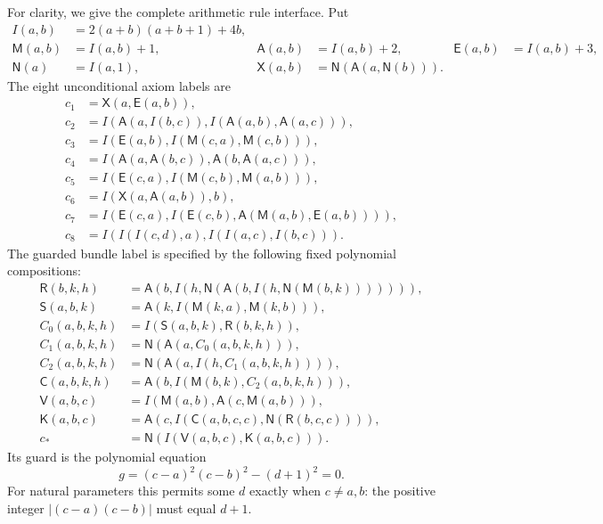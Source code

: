 \documentclass[10pt,letterpaper]{article}
\theoremstyle{definition}\newtheorem{definition}[theorem]{Definition}
\theoremstyle{remark}\newtheorem{remark}[theorem]{Remark}
\begin{document}
For clarity, we give the complete arithmetic rule interface. Put
\begin{align*}
 I(a,b)&=2(a+b)(a+b+1)+4b,\\
 \mathsf M(a,b)&=I(a,b)+1,&\mathsf A(a,b)&=I(a,b)+2,&\mathsf E(a,b)&=I(a,b)+3,\\
 \mathsf N(a)&=I(a,1),&\mathsf X(a,b)&=\mathsf N(\mathsf A(a,\mathsf N(b))).
\end{align*}
The eight unconditional axiom labels are
\begin{align*}
 c_1&=\mathsf X(a,\mathsf E(a,b)),\\
 c_2&=I(\mathsf A(a,I(b,c)),I(\mathsf A(a,b),\mathsf A(a,c))),\\
 c_3&=I(\mathsf E(a,b),I(\mathsf M(c,a),\mathsf M(c,b))),\\
 c_4&=I(\mathsf A(a,\mathsf A(b,c)),\mathsf A(b,\mathsf A(a,c))),\\
 c_5&=I(\mathsf E(c,a),I(\mathsf M(c,b),\mathsf M(a,b))),\\
 c_6&=I(\mathsf X(a,\mathsf A(a,b)),b),\\
 c_7&=I(\mathsf E(c,a),I(\mathsf E(c,b),\mathsf A(\mathsf M(a,b),\mathsf E(a,b)))),\\
 c_8&=I(I(I(c,d),a),I(I(a,c),I(b,c))).
\end{align*}
The guarded bundle label is specified by the following fixed polynomial
compositions:
\begin{align*}
 \mathsf R(b,k,h)&=\mathsf A(b,I(h,\mathsf N(\mathsf A(b,I(h,\mathsf N(\mathsf M(b,k))))))),\\
 \mathsf S(a,b,k)&=\mathsf A(k,I(\mathsf M(k,a),\mathsf M(k,b))),\\
 C_0(a,b,k,h)&=I(\mathsf S(a,b,k),\mathsf R(b,k,h)),\\
 C_1(a,b,k,h)&=\mathsf N(\mathsf A(a,C_0(a,b,k,h))),\\
 C_2(a,b,k,h)&=\mathsf N(\mathsf A(a,I(h,C_1(a,b,k,h)))),\\
 \mathsf C(a,b,k,h)&=\mathsf A(b,I(\mathsf M(b,k),C_2(a,b,k,h))),\\
 \mathsf V(a,b,c)&=I(\mathsf M(a,b),\mathsf A(c,\mathsf M(a,b))),\\
 \mathsf K(a,b,c)&=\mathsf A(c,I(\mathsf C(a,b,c,c),\mathsf N(\mathsf R(b,c,c)))),\\
 c_*&=\mathsf N(I(\mathsf V(a,b,c),\mathsf K(a,b,c))).
\end{align*}
Its guard is the polynomial equation
\begin{equation}\label{eq:guard}
 g=(c-a)^2(c-b)^2-(d+1)^2=0.
\end{equation}
For natural parameters this permits some $d$ exactly when $c\ne a,b$:
the positive integer $|(c-a)(c-b)|$ must equal $d+1$.
\end{document}
